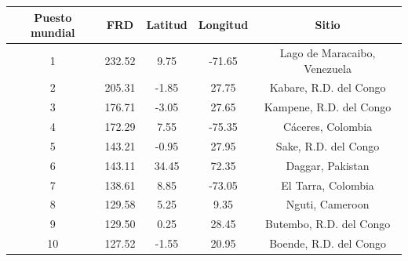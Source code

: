\documentclass[12pt,oneside,openany,letter]{book}
\begin{document}
\begin{table}[]
\begin{tabular}{|c|c|c|c|c|}
\hline
\textbf{Puesto mundial} & \textbf{FRD} & \textbf{Latitud} & \textbf{Longitud} & \textbf{Sitio}               \\ \hline
1                       & 232.52       & 9.75             & -71.65            & Lago de Maracaibo, Venezuela \\ \hline
2                       & 205.31       & -1.85            & 27.75             & Kabare, R.D. del Congo       \\ \hline
3                       & 176.71       & -3.05            & 27.65             & Kampene, R.D. del Congo      \\ \hline
4                       & 172.29       & 7.55             & -75.35            & Cáceres, Colombia            \\ \hline
5                       & 143.21       & -0.95            & 27.95             & Sake, R.D. del Congo         \\ \hline
6                       & 143.11       & 34.45            & 72.35             & Daggar, Pakistan             \\ \hline
7                       & 138.61       & 8.85             & -73.05            & El Tarra, Colombia           \\ \hline
8                       & 129.58       & 5.25             & 9.35              & Nguti, Cameroon              \\ \hline
9                       & 129.50       & 0.25             & 28.45             & Butembo, R.D. del Congo      \\ \hline
10                      & 127.52       & -1.55            & 20.95             & Boende, R.D. del Congo       \\ \hline
\end{tabular}
\end{table}
\end{document}
